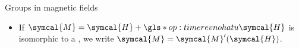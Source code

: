 \begin{frame}{Groups in magnetic fields}
\begin{itemize}
      \item<10-> If $\symcal{M} = \symcal{H} + \gls*{op:timerevnohat} u \symcal{H}$ is isomorphic to a , we write $\symcal{M} = \symcal{M}'(\symcal{H})$.
    \end{itemize}



  \end{frame}